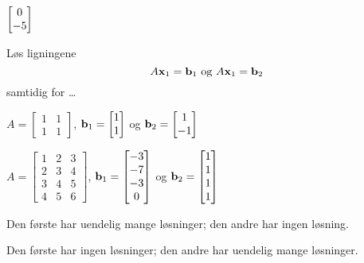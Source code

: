 \begin{losning}
$\begin{bmatrix} 0 \\ -5 \end{bmatrix}$
\end{losning}


\begin{oppgave}
Løs ligningene
\[
A\mathbf{x}_1=\mathbf{b}_1\text{ og }A\mathbf{x}_1=\mathbf{b}_2
\]
samtidig for \ldots


\begin{punkt}
$A=\begin{bmatrix}
1 & 1\\
1 & 1
\end{bmatrix}
$, $\mathbf{b}_1=\begin{bmatrix} 1 \\ 1 \end{bmatrix}$ og $\mathbf{b}_2=\begin{bmatrix} 1 \\ -1 \end{bmatrix}$
\end{punkt}




\begin{punkt}
$A=\begin{bmatrix}
	1 & 2 & 3\\
	2 & 3 & 4\\
	3 & 4 & 5\\
	4 & 5 & 6
	\end{bmatrix}
	$,
$\mathbf{b}_1=
	\begin{bmatrix}
	-3  \\
	-7 \\
	-3 \\
	0
	\end{bmatrix}
$ og 
$\mathbf{b}_2=
	\begin{bmatrix}
	1  \\
	1 \\
	1 \\
	1
	\end{bmatrix}
$
\end{punkt}



\end{oppgave}


\begin{losning}


\begin{punkt}
Den første har uendelig mange løsninger; den andre har ingen løsning.
\end{punkt}


\begin{punkt}
Den første har ingen løsninger; den andre har uendelig mange løsninger.
\end{punkt}

\end{losning}



